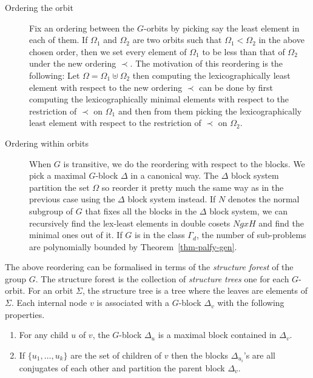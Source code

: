 \documentclass{article}
\begin{document}
\begin{description}
\item[Ordering the orbit] Fix an ordering between the $G$-orbits by
  picking say the least element in each of them. If $\Omega_1$ and
  $\Omega_2$ are two orbits such that $\Omega_1 < \Omega_2$ in the
  above chosen order, then we set every element of $\Omega_1$ to be
  less than that of $\Omega_2$ under the new ordering $\prec$. The
  motivation of this reordering is the following: Let $\Omega =
  \Omega_1 \uplus \Omega_2$ then computing the lexicographically least
  element with respect to the new ordering $\prec$ can be done by
  first computing the lexicographically minimal elements with respect
  to the restriction of $\prec$ on $\Omega_1$ and then from them
  picking the lexicographically least element with respect to the
  restriction of $\prec$ on $\Omega_2$.

\item[Ordering within orbits] When $G$ is transitive, we do the
  reordering with respect to the blocks. We pick a maximal $G$-block
  $\Delta$ in a canonical way. The $\Delta$ block system partition the
  set $\Omega$ so reorder it pretty much the same way as in the
  previous case using the $\Delta$ block system instead. If $N$
  denotes the normal subgroup of $G$ that fixes all the blocks in the
  $\Delta$ block system, we can recursively find the lex-least
  elements in double cosets $NgxH$ and find the minimal ones out of
  it. If $G$ is in the class $\Gamma_d$, the number of sub-problems
  are polynomially bounded by Theorem~\ref{thm-palfy-gen}.
\end{description}

The above reordering can be formalised in terms of the \emph{structure
  forest} of the group $G$. The structure forest is the collection of
\emph{structure trees} one for each $G$-orbit. For an orbit $\Sigma$,
the structure tree is a tree where the leaves are elements of
$\Sigma$.  Each internal node $v$ is associated with a $G$-block
$\Delta_v$ with the following properties.

\begin{enumerate}
\item For any child $u$ of $v$, the $G$-block $\Delta_u$ is a maximal
  block contained in $\Delta_v$.
\item If $\{u_1,\ldots, u_k\}$ are the set of children of $v$ then the
  blocks $\Delta_{u_i}$'s are all conjugates of each other and
  partition the parent block $\Delta_v$.
\end{enumerate}
\end{document}
